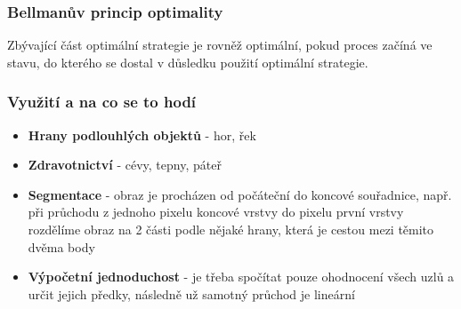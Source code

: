 \documentclass{beamer}
\begin{document}

	\begin{frame}[t,fragile]
		\frametitle{Bellmanův princip optimality}	

		Zbývající část optimální strategie je rovněž optimální, pokud proces začíná ve stavu, do kterého se dostal v důsledku použití optimální strategie.
			
	\end{frame}
	
	
	\begin{frame}[t,fragile]
		\frametitle{Využití a na co se to hodí}	

		\begin{itemize}
			\item \textbf{Hrany podlouhlých objektů} - hor, řek
			\item \textbf{Zdravotnictví} - cévy, tepny, páteř
			\item \textbf{Segmentace} - obraz je procházen od počáteční do koncové souřadnice, např. při průchodu z jednoho pixelu koncové vrstvy do pixelu první vrstvy rozdělíme obraz na 2 části podle nějaké hrany, která je cestou mezi těmito dvěma body
			\item \textbf{Výpočetní jednoduchost} - je třeba spočítat pouze ohodnocení všech uzlů a určit jejich předky, následně už samotný průchod je lineární
		\end{itemize}
		
	\end{frame}
	
\end{document}
